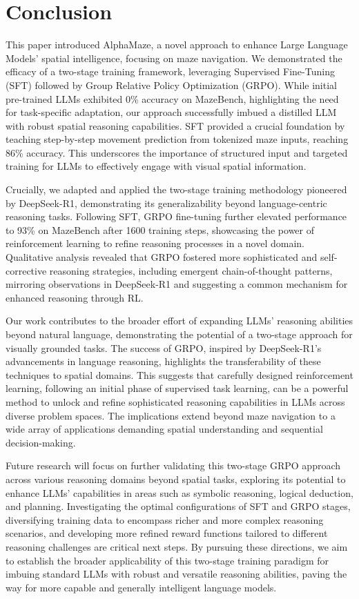 \section{Conclusion}
\label{sec:conclusion}

This paper introduced AlphaMaze, a novel approach to enhance Large Language Models' spatial intelligence, focusing on maze navigation. We demonstrated the efficacy of a two-stage training framework, leveraging Supervised Fine-Tuning (SFT) followed by Group Relative Policy Optimization (GRPO). While initial pre-trained LLMs exhibited 0\% accuracy on MazeBench, highlighting the need for task-specific adaptation, our approach successfully imbued a distilled LLM with robust spatial reasoning capabilities. SFT provided a crucial foundation by teaching step-by-step movement prediction from tokenized maze inputs, reaching 86\% accuracy. This underscores the importance of structured input and targeted training for LLMs to effectively engage with visual spatial information.

Crucially, we adapted and applied the two-stage training methodology pioneered by DeepSeek-R1, demonstrating its generalizability beyond language-centric reasoning tasks. Following SFT, GRPO fine-tuning further elevated performance to 93\% on MazeBench after 1600 training steps, showcasing the power of reinforcement learning to refine reasoning processes in a novel domain. Qualitative analysis revealed that GRPO fostered more sophisticated and self-corrective reasoning strategies, including emergent chain-of-thought patterns, mirroring observations in DeepSeek-R1 and suggesting a common mechanism for enhanced reasoning through RL.

Our work contributes to the broader effort of expanding LLMs' reasoning abilities beyond natural language, demonstrating the potential of a two-stage approach for visually grounded tasks. The success of GRPO, inspired by DeepSeek-R1's advancements in language reasoning, highlights the transferability of these techniques to spatial domains. This suggests that carefully designed reinforcement learning, following an initial phase of supervised task learning, can be a powerful method to unlock and refine sophisticated reasoning capabilities in LLMs across diverse problem spaces. The implications extend beyond maze navigation to a wide array of applications demanding spatial understanding and sequential decision-making.

Future research will focus on further validating this two-stage GRPO approach across various reasoning domains beyond spatial tasks, exploring its potential to enhance LLMs' capabilities in areas such as symbolic reasoning, logical deduction, and planning. Investigating the optimal configurations of SFT and GRPO stages, diversifying training data to encompass richer and more complex reasoning scenarios, and developing more refined reward functions tailored to different reasoning challenges are critical next steps. By pursuing these directions, we aim to establish the broader applicability of this two-stage training paradigm for imbuing standard LLMs with robust and versatile reasoning abilities, paving the way for more capable and generally intelligent language models.